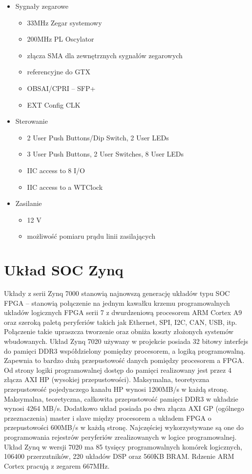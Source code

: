 \documentclass[a4paper,11pt,oneside]{book}  %
\begin{document}
\begin{itemize}
\item Sygnały zegarowe
	\begin{itemize}
	\item 33MHz Zegar systemowy
	\item 200MHz PL Oscylator
	\item złącza SMA dla zewnętrznych sygnałów zegarowych
	\item referencyjne do GTX 
	\item OBSAI/CPRI – SFP+ 
	\item EXT Config CLK
	\end{itemize}

\item Sterowanie
	\begin{itemize}
	\item 2 User Push Buttons/Dip Switch, 2 User LEDs
	\item 3 User Push Buttons, 2 User Switches, 8 User LEDs
	\item IIC access to 8 I/O
	\item IIC access to a WTClock
	\end{itemize}

\item Zasilanie
	\begin{itemize}
	\item 12 V 
	\item możliwość pomiaru prądu linii zasilających
	\end{itemize}
\end{itemize}

\section{Układ SOC Zynq}
Układy z serii Zynq 7000 stanowią najnowszą generację układów typu SOC FPGA – stanowią połączenie na jednym kawałku krzemu programowalnych układów logicznych FPGA serii 7 z dwurdzeniową procesorem ARM Cortex A9 oraz szeroką paletą peryferiów takich jak Ethernet, SPI, I2C, CAN, USB, itp. Połączenie takie upraszcza tworzenie oraz obniża koszty złożonych systemów wbudowanych. Układ Zynq 7020 używany w projekcie posiada 32 bitowy interfejs do pamięci DDR3 współdzielony pomiędzy procesorem, a logiką programowalną. Zapewnia to bardzo dużą przepustowość danych pomiędzy procesorem a FPGA. Od strony logiki programowalnej dostęp do pamięci realizowany jest przez 4 złącza AXI HP (wysokiej przepustowości). Maksymalna, teoretyczna przepustowość pojedynczego kanału HP wynosi 1200MB/s w każdą stronę. Maksymalna, teoretyczna, całkowita przepustowość pamięci DDR3 w układzie wynosi 4264 MB/s. Dodatkowo układ posiada po dwa złącza AXI GP (ogólnego przeznaczenia) master i slave między procesorem a układem FPGA o przepustowości 600MB/s w każdą stronę. Najczęściej wykorzystywane są one do programowania rejestrów peryferiów zrealizowanych w logice programowalnej. Układ Zynq w wersji 7020 ma 85 tysięcy programowalnych komórek logicznych, 106400 przerzutników, 220 układów DSP oraz 560KB BRAM. Rdzenie ARM Cortex pracują z zegarem 667MHz.
\end{document}

